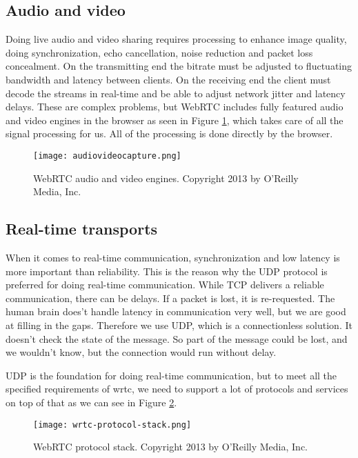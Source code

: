 \subsection{Audio and video}
Doing live audio and video sharing requires processing to enhance image quality, doing synchronization, echo cancellation, noise reduction and packet loss concealment\cite{grigorik_high_2013}. On the transmitting end the bitrate must be adjusted to fluctuating bandwidth and latency between clients. On the receiving end the client must decode the streams in real-time and be able to adjust network jitter and latency delays. These are complex problems, but WebRTC includes fully featured audio and video engines in the browser as seen in Figure \ref{fig:audiovideocapture}, which takes care of all the signal processing for us. All of the processing is done directly by the browser.

\begin{figure}[here]
\centerline{\texttt{[image: audiovideocapture.png]}}
\caption{WebRTC audio and video engines. Copyright 2013 by O'Reilly Media, Inc.}
\label{fig:audiovideocapture}
\end{figure}

\subsection{Real-time transports}
When it comes to real-time communication, synchronization and low latency is more important than reliability. This is the reason why the UDP protocol is preferred for doing real-time communication. While TCP delivers a reliable communication, there can be delays. If a packet is lost, it is re-requested. The human brain does't handle latency in communication very well, but we are good at filling in the gaps. Therefore we use UDP, which is a connectionless solution. It doesn't check the state of the message. So part of the message could be lost, and we wouldn't know, but the connection would run without delay.

UDP is the foundation for doing real-time communication, but to meet all the specified requirements of \gls{wrtc}, we need to support a lot of protocols and services on top of that as we can see in Figure \ref{fig:wrtc-protocol-stack}.

\begin{figure}[here]
\centerline{\texttt{[image: wrtc-protocol-stack.png]}}
\caption{WebRTC protocol stack. Copyright 2013 by O'Reilly Media, Inc.}
\label{fig:wrtc-protocol-stack}
\end{figure}

